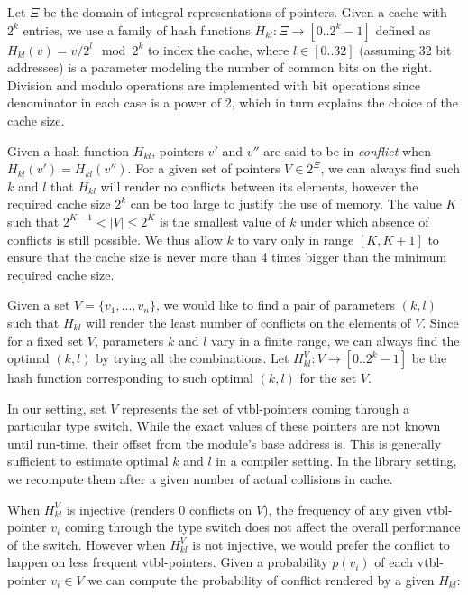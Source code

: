 Let $\Xi$ be the domain of integral representations of pointers. Given a cache 
with $2^k$ entries, we use a family of hash functions $H_{kl} : \Xi \rightarrow [0..2^k-1]$ 
defined as $H_{kl}(v)=v/2^l \mod 2^k$ to index the cache, where $l \in [0..32]$ 
(assuming 32 bit addresses) is a parameter modeling the number of common bits on 
the right. Division and modulo operations are implemented with bit operations since 
denominator in each case is a power of 2, which in turn explains the choice of 
the cache size.

Given a hash function $H_{kl}$, pointers $v'$ and $v''$ are said to be in 
\emph{conflict} when $H_{kl}(v')=H_{kl}(v'')$. For a given set of pointers 
$V \in 2^{\Xi}$, we can always find such $k$ and $l$ that $H_{kl}$ will render no  
conflicts between its elements, however the required cache size $2^k$ can be too 
large to justify the use of memory. The value $K$ such that $2^{K-1} < |V| \leq 2^K$ 
is the smallest value of $k$ under which absence of conflicts is still possible. 
We thus allow $k$ to vary only in range $[K,K+1]$ to ensure that the cache size 
is never more than 4 times bigger than the minimum required cache size.

Given a set $V = \{v_1, ... , v_n\}$, we would like to find a pair of parameters 
$(k,l)$ such that $H_{kl}$ will render the least number of conflicts on the 
elements of $V$. Since for a fixed set $V$, parameters $k$ and $l$ vary in a 
finite range, we can always find the optimal $(k,l)$ by trying all the
combinations. Let $H_{kl}^V : V \rightarrow [0..2^k-1]$ be the hash function 
corresponding to such optimal $(k,l)$ for the set $V$. 

In our setting, set $V$ represents the set of vtbl-pointers coming through a 
particular type switch. While the exact values of these pointers are not known 
until run-time, their offset from the module's base address is. This is generally 
sufficient to estimate optimal $k$ and $l$ in a compiler setting. In the library 
setting, we recompute them after a given number of actual collisions in cache.

When $H_{kl}^V$ is injective (renders 0 conflicts on $V$), the frequency of any 
given vtbl-pointer $v_i$ coming through the type switch does not affect the 
overall performance of the switch. However when $H_{kl}^V$ is not injective, we 
would prefer the conflict to happen on less frequent vtbl-pointers.
Given a probability $p(v_i)$ of each vtbl-pointer $v_i \in V$ we can compute the 
probability of conflict rendered by a given $H_{kl}$:

